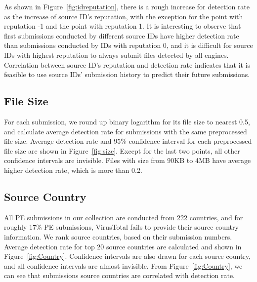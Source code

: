 As shown in Figure~\ref{fig:idreputation}, 
there is a rough increase for detection rate as the increase of source ID's reputation, 
with the exception for the point with reputation -1 and the point with reputation 1. 
It is interesting to observe that first submissions conducted by different source IDs have higher 
detection rate than submissions conducted by IDs with reputation 0, 
and it is difficult for source IDs with highest reputation to always submit files detected by all engines. 
Correlation between source ID's reputation and detection rate indicates 
that it is feasible to use source IDs' submission history to predict their future submissions.

\subsection{File Size}
\label{sec:size}

For each submission, we round up binary logarithm for its file size to nearest 0.5,
and calculate average detection rate for submissions with the same preprocessed file size.
Average detection rate and 95\% confidence interval for each preprocessed 
file size are shown in Figure~\ref{fig:size}.
Except for the last two points, all other confidence intervals are invisible.   
Files with size from 90KB to 4MB have average higher detection rate, which is more than 0.2. 


\subsection{Source Country}
\label{sec:country}

All PE submissions in our collection are conducted from 222 countries, 
and for roughly 17\% PE submissions, 
VirusTotal fails to provide their source country information. 
We rank source countries, based on their submission numbers. 
Average detection rate for top 20 source countries are calculated and shown in 
Figure~\ref{fig:Country}. 
Confidence intervals are also drawn for each source country, 
and all confidence intervals are almost invisible. 
From Figure~\ref{fig:Country}, 
we can see that submissions source countries are correlated with detection rate.



